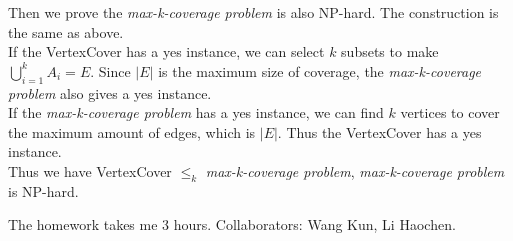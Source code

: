 \documentclass{oxmathproblems}
\begin{document}
\begin{questions}
Then we prove the \emph{max-k-coverage problem} is also NP-hard. The construction is the same as above.\\
If the VertexCover has a yes instance, we can select $k$ subsets to make $\bigcup_{i=1}^k A_i=E$. Since $|E|$ is the maximum size of coverage, the \emph{max-k-coverage problem} also gives a yes instance.\\
If the \emph{max-k-coverage problem} has a yes instance, we can find $k$ vertices to cover the maximum amount of edges, which is $|E|$. Thus the VertexCover has a yes instance.\\
Thus we have VertexCover $\le_k$ \emph{max-k-coverage problem}, \emph{max-k-coverage problem} is NP-hard.

\miquestion
The homework takes me 3 hours. Collaborators: Wang Kun, Li Haochen.
\end{questions}
\end{document}
